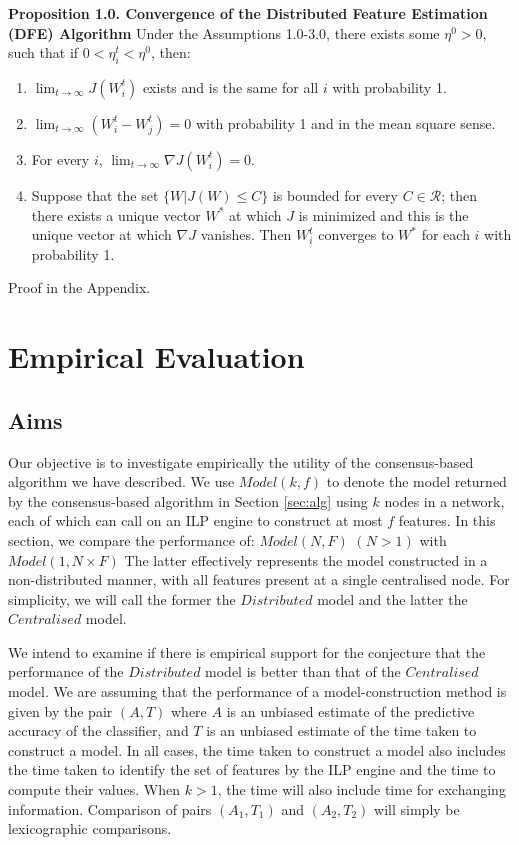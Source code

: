 \noindent \textbf{Proposition 1.0. Convergence of the Distributed Feature Estimation (DFE) Algorithm } Under the Assumptions 1.0-3.0, there exists some $\eta^0 > 0$, such that if $0 < \eta_i^t < \eta^0$, then:
\begin{enumerate}
\item $\lim_{t \to \infty} J(W_i^t)$ exists and is the same for all $i$ with probability 1.
\item $\lim_{t \to \infty} (W_i^t - W_j^t)=0$ with probability 1 and in the mean square sense.
\item For every $i$, $\lim_{t \to \infty}\nabla J(W_i^t) = 0$.
\item Suppose that the set $\{W|J(W) \le C\}$ is bounded for every $C \in \mathcal{R}$; then there exists a unique vector $W^{*}$ at which $J$ is minimized and this is the unique vector at which $\nabla J$ vanishes. Then $W_i^t$ converges to $W^{*}$ for each $i$ with probability 1.
\end{enumerate}
 
 \noindent Proof in the Appendix.


\section{Empirical Evaluation}
\label{sec:expt}

\subsection{Aims}
\label{sec:exptaims}
Our objective is to investigate empirically the utility of the consensus-based
algorithm we have described. 
We use $Model(k,f)$ to denote the model returned by the consensus-based
algorithm in Section \ref{sec:alg}
using $k$ nodes in a network, each of which can call on an ILP engine to
construct at most $f$ features. In this section, we compare the
performance of: $Model(N,F)$ $(N > 1)$ with $Model(1,N \times F)$ The latter
effectively represents the model constructed in a non-distributed manner, with
all features present at a single centralised node. For simplicity, we
will call the former the $Distributed$ model and the latter the $Centralised$
model.

We intend to examine if there is empirical support for the conjecture
that the performance of the $Distributed$ model  is better than that of the $Centralised$ model.
We are assuming that the performance of a
model-construction method is given by the pair $(A,T)$
where $A$ is an unbiased estimate of the predictive accuracy of
the classifier, and $T$ is an unbiased estimate of the
time taken to construct a model. In all cases, 
the time taken to construct a model also includes the time taken to identify the
set of features by the ILP engine and the time to compute their values.
When $k > 1$, the time will also include
time for exchanging information. Comparison of
pairs $(A_1,T_1)$ and $(A_2,T_2)$ will simply be lexicographic comparisons. 


